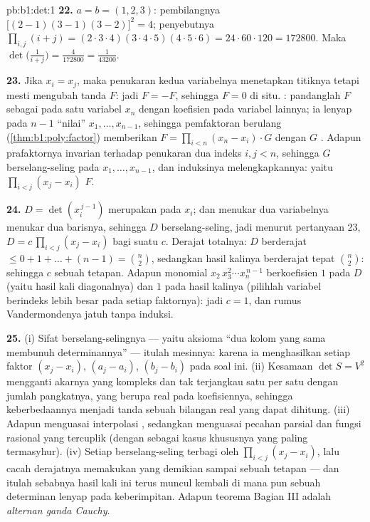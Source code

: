 \begin{solution}{pb:b1:det:1}
\textbf{22.} $a = b = (1, 2, 3)$: pembilangnya $\bigl[(2-1)(3-1)
(3-2)\bigr]^2 = 4$; penyebutnya $\prod_{i,j}(i + j) =
(2\cdot3\cdot4)(3\cdot4\cdot5)(4\cdot5\cdot6) = 24\cdot60\cdot120
= 172800$. Maka $\det\bigl(\frac1{i+j}\bigr) = \frac{4}{172800}
= \frac1{43200}$.

\textbf{23.} Jika $x_i = x_j$, maka penukaran kedua variabelnya menetapkan
titiknya tetapi mesti mengubah tanda $F$: jadi $F = -F$, sehingga $F = 0$
di situ. : pandanglah $F$ sebagai  pada satu
variabel $x_n$ dengan koefisien pada variabel lainnya; ia
lenyap pada $n - 1$ ``nilai'' $x_1, \dots, x_{n-1}$, sehingga
pemfaktoran berulang (\cref{thm:b1:poly:factor}) memberikan $F =
\prod_{i<n}(x_n - x_i)\cdot G$ dengan $G$ . Adapun
prafaktornya invarian terhadap penukaran dua indeks $i, j < n$, sehingga
$G$ berselang-seling pada $x_1, \dots, x_{n-1}$, dan induksinya
melengkapkannya: yaitu $\prod_{i<j}(x_j - x_i)$  $F$.

\textbf{24.} $D = \det(x_i^{\,j-1})$ merupakan  pada
$x_i$; dan menukar dua variabelnya menukar dua barisnya, sehingga $D$
berselang-seling, jadi menurut pertanyaan 23, $D = c\,\prod_{i<j}(x_j - x_i)$
bagi suatu  $c$. Derajat totalnya: $D$ berderajat $\leq 0 +
1 + \dots + (n-1) = \binom n2$, sedangkan hasil kalinya berderajat tepat
$\binom n2$: sehingga $c$ sebuah tetapan. Adapun monomial $x_2\,x_3^2\cdots
x_n^{\,n-1}$ berkoefisien $1$ pada $D$ (yaitu hasil kali diagonalnya) dan
$1$ pada hasil kalinya (pilihlah variabel berindeks lebih besar pada setiap
faktornya): jadi $c = 1$, dan rumus Vandermondenya jatuh tanpa
induksi.

\textbf{25.} (i) Sifat berselang-selingnya --- yaitu aksioma ``dua kolom yang sama
membunuh determinannya'' --- itulah mesinnya: karena ia menghasilkan setiap
faktor $(x_j - x_i)$, $(a_j - a_i)$, $(b_j - b_i)$ pada
soal ini. (ii) Kesamaan $\det S = V^2$ mengganti
akarnya yang kompleks dan tak terjangkau satu per satu dengan jumlah pangkatnya,
yang berupa  real pada koefisiennya, sehingga keberbedaannya
menjadi tanda sebuah bilangan real yang dapat dihitung. (iii) Adapun
 menguasai interpolasi , sedangkan
 menguasai pecahan parsial dan fungsi rasional
yang tercuplik (dengan  sebagai kasus khususnya yang
paling termasyhur). (iv) Setiap  berselang-seling terbagi oleh
$\prod_{i<j}(x_j - x_i)$, lalu cacah derajatnya memakukan 
yang demikian sampai sebuah tetapan --- dan itulah sebabnya hasil kali ini
terus muncul kembali di mana pun sebuah determinan lenyap pada
keberimpitan. Adapun teorema Bagian III adalah \emph{alternan ganda
Cauchy}.

\end{solution}
